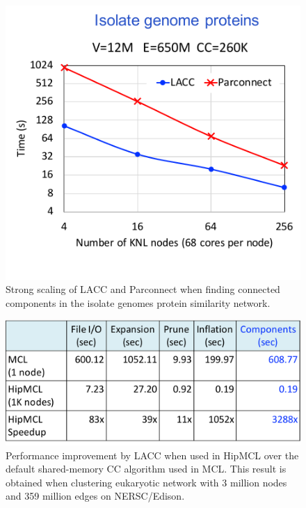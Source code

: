 \begin{figure}[!t]
   \centering
   \includegraphics[scale=.5]{figures/isolates} %
   \caption{Strong scaling of LACC and Parconnect when finding connected components in  the isolate genomes protein similarity network. }
   \label{fig:multiply_nnzx}
\end{figure}

\begin{figure}[!t]
   \centering
   \includegraphics[scale=.5]{figures/hipmcl} %
   \caption{Performance improvement by LACC when used in HipMCL over the default shared-memory CC algorithm used in MCL. This result is obtained when clustering eukaryotic network with 3 million nodes and 359 million edges on NERSC/Edison.}
   \label{fig:hipmcl}
\end{figure}





